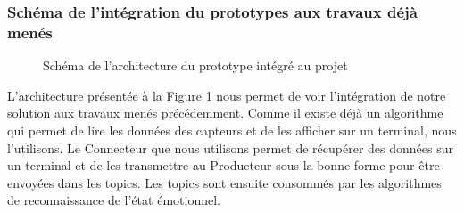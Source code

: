 \documentclass[11pt]{article}
\begin{document}
		\subsubsection{Schéma de l'intégration du prototypes aux travaux déjà menés}\label{sec:schematravaux}
			\begin{figure}
				\centering
				\vspace*{-1cm}
				\caption{Schéma de l'architecture du prototype intégré au projet}
				\label{fig:archiglobale}
			\end{figure}
			L'architecture présentée à la Figure \ref{fig:archiglobale} nous permet de voir l'intégration de notre solution aux travaux menés précédemment.
			Comme il existe déjà un algorithme qui permet de lire les données des capteurs et de les afficher sur un terminal, nous l'utilisons.
			Le Connecteur que nous utilisons permet de récupérer des données sur un terminal et de les transmettre au Producteur sous la bonne forme pour être envoyées dans les topics.
			Les topics sont ensuite consommés par les algorithmes de reconnaissance de l'état émotionnel.
\end{document}
